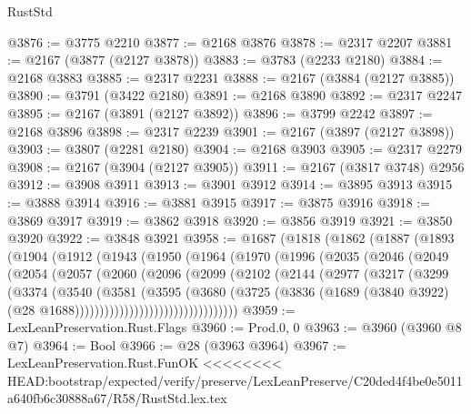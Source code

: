 \begin{lexlean}{RustStd}
\begin{coremodule}
{\begin{coremodule}
{{{{{{{{{{{{{{{{@3876 := @3775 @2210
@3877 := @2168 @3876
@3878 := @2317 @2207
@3881 := @2167 (@3877 (@2127 @3878))
@3883 := @3783 (@2233 @2180)
@3884 := @2168 @3883
@3885 := @2317 @2231
@3888 := @2167 (@3884 (@2127 @3885))
@3890 := @3791 (@3422 @2180)
@3891 := @2168 @3890
@3892 := @2317 @2247
@3895 := @2167 (@3891 (@2127 @3892))
@3896 := @3799 @2242
@3897 := @2168 @3896
@3898 := @2317 @2239
@3901 := @2167 (@3897 (@2127 @3898))
@3903 := @3807 (@2281 @2180)
@3904 := @2168 @3903
@3905 := @2317 @2279
@3908 := @2167 (@3904 (@2127 @3905))
@3911 := @2167 (@3817 @3748) @2956
@3912 := @3908 @3911
@3913 := @3901 @3912
@3914 := @3895 @3913
@3915 := @3888 @3914
@3916 := @3881 @3915
@3917 := @3875 @3916
@3918 := @3869 @3917
@3919 := @3862 @3918
@3920 := @3856 @3919
@3921 := @3850 @3920
@3922 := @3848 @3921
@3958 := @1687
    (@1818
      (@1862
        (@1887
          (@1893
            (@1904
              (@1912
                (@1943
                  (@1950
                    (@1964
                      (@1970
                        (@1996
                          (@2035
                            (@2046
                              (@2049
                                (@2054
                                  (@2057
                                    (@2060
                                      (@2096
                                        (@2099
                                          (@2102
                                            (@2144
                                              (@2977
                                                (@3217
                                                  (@3299
                                                    (@3374
                                                      (@3540
                                                        (@3581
                                                          (@3595
                                                            (@3680
                                                              (@3725
                                                                (@3836
                                                                  (@1689
                                                                    (@3840 @3922)
                                                                    (@28
                                                                      @1688)))))))))))))))))))))))))))))))))
@3959 := LexLeanPreservation.Rust.Flags
@3960 := Prod.{0, 0}
@3963 := @3960 (@3960 @8 @7)
@3964 := Bool
@3966 := @28 (@3963 @3964)
@3967 := LexLeanPreservation.Rust.FunOK
<<<<<<<< HEAD:bootstrap/expected/verify/preserve/LexLeanPreserve/C20ded4f4be0e5011a640fb6c30888a67/R58/RustStd.lex.tex
}}}}}}}}}}}}}}}}
\end{coremodule}}
\end{coremodule}
\end{lexlean}
